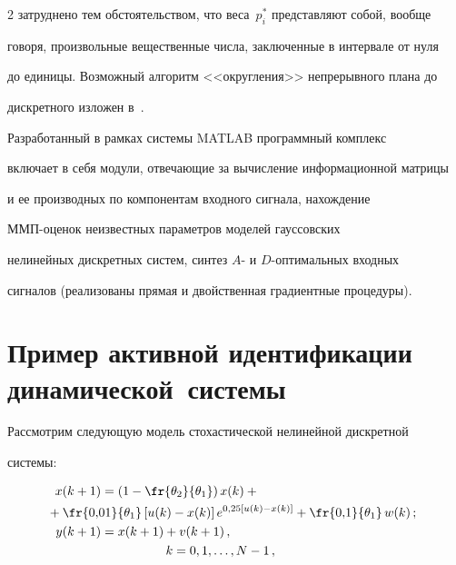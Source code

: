 \begin{multicols}{2}
затруднено тем обстоятельством, что веса~$p_i^*$ представляют собой, вообще


говоря, произвольные вещественные числа, заключенные в интервале от нуля


до единицы. Возможный алгоритм <<округления>> непрерывного плана до


дискретного изложен в~\cite{6-c}.





     Разработанный в рамках системы MATLAB программный комплекс


включает в себя модули, отвечающие за вычисление информационной матрицы


и ее производных по компонентам входного сигнала, нахождение


     ММП-оце\-нок неизвестных параметров моделей гауссовских


нелинейных дискретных систем, синтез $A$- и $D$-оп\-ти\-маль\-ных входных


сигналов (реализованы прямая и двойственная градиентные процедуры).





\section{Пример активной идентификации динамической~системы}





  Рассмотрим следующую модель стохастической нелинейной дискретной


системы:


  \begin{align}


  x(k+1) &=\left(1-\fr{\theta_2}{\theta_1}\right) x(k)+{}\notag\\


&\hspace*{-15mm}  {}+\fr{0{,}01}{\theta_1}\left[


u(k)-x(k)\right] e^{0{,}25[u(k)-x(k)]}+\fr{0{,}1}{\theta_1}\,w(k)\,;\label{e20-c}\\


  y(k+1) &= x(k+1)+v(k+1)\,, \notag\\


  &\hspace*{18mm}k=0,1,\ldots , N-1\,,


  \label{e21-c}


  \end{align}



\end{multicols}
